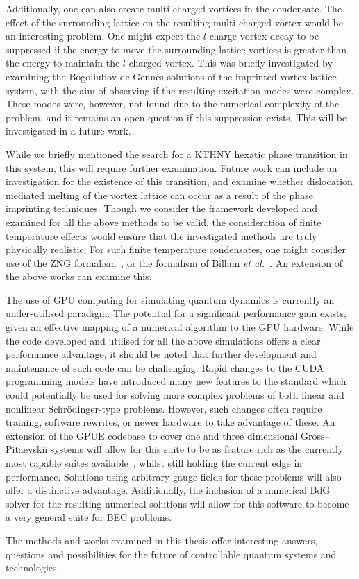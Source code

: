 Additionally, one can also create multi-charged vortices in the condensate. The effect of the surrounding lattice on the resulting multi-charged vortex would be an interesting problem. One might expect the $l$-charge vortex decay to be suppressed if the energy to move the surrounding lattice vortices is greater than the energy to maintain the $l$-charged vortex. This was briefly investigated by examining the Bogoliubov-de Gennes solutions of the imprinted vortex lattice system, with the aim of observing if the resulting excitation modes were complex. These modes were, however, not found due to the numerical complexity of the problem, and it remains an open question if this suppression exists. This will be investigated in a future work.

While we briefly mentioned the search for a KTHNY hexatic phase transition in this system, this will require further examination. Future work can include an investigation for the existence of this transition, and examine whether dislocation mediated melting of the vortex lattice can occur as a result of the phase imprinting techniques. Though we consider the framework developed and examined for all the above methods to be valid, the consideration of finite temperature effects would ensure that the investigated methods are truly physically realistic. For such finite temperature condensates, one might consider use of the ZNG formalism~\cite{BK:Proukakis_finitetemp_2013}, or the formalism of Billam \textit{et al.}~\cite{BEC:Billam_pra_2013}. An extension of the above works can examine this.

The use of GPU computing for simulating quantum dynamics is currently an under-utilised paradigm. The potential for a significant performance gain exists, given an effective mapping of a numerical algorithm to the GPU hardware. While the code developed and utilised for all the above simulations offers a clear performance advantage, it should be noted that further development and maintenance of such code can be challenging. Rapid changes to the CUDA programming models have introduced many new features to the standard which could potentially be used for solving more complex problems of both linear and nonlinear Schr\"odinger-type problems. However, such changes often require training, software rewrites, or newer hardware to take advantage of these. An extension of the GPUE codebase to cover one and three dimensional Gross--Pitaevskii systems will allow for this suite to be as feature rich as the currently most capable suites available~\cite{NUM:Wittek_cpc_2013,NUM:GPElab_1}, whilst still holding the current edge in performance. Solutions using arbitrary gauge fields for these problems will also offer a distinctive advantage. Additionally, the inclusion of a numerical BdG solver for the resulting numerical solutions will allow for this software to become a very general suite for BEC problems.

The methods and works examined in this thesis offer interesting answers, questions and possibilities for the future of controllable quantum systems and technologies.
